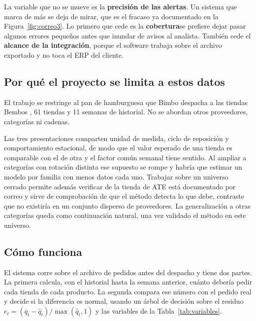 La variable que no se mueve es la \textbf{precisión de las alertas}. Un sistema que marca de más se deja de mirar, que es el fracaso ya documentado en la Figura~\ref{fig:correo3}. Lo primero que cede es la \textbf{cobertura}se prefiere dejar pasar algunos errores pequeños antes que inundar de avisos al analista. También cede el \textbf{alcance de la integración}, porque el software trabaja sobre el archivo exportado y no toca el ERP del cliente.

\subsection{Por qué el proyecto se limita a estos datos}
\label{sec:limite}

El trabajo se restringe al pan de hamburguesa que Bimbo despacha a las tiendas Bembos , 61 tiendas y 11 semanas de historial. No se abordan otros proveedores, categorías ni cadenas.

 Las tres presentaciones comparten unidad de medida, ciclo de reposición y comportamiento estacional, de modo que el valor esperado de una tienda es comparable con el de otra y el factor común semanal tiene sentido. Al ampliar a categorías con rotación distinta ese supuesto se rompe y habría que estimar un modelo por familia con menos datos cada uno. Trabajar sobre un universo cerrado permite además verificar  de la tienda de ATE está documentado por correo y sirve de comprobación de que el método detecta lo que debe, contraste que no existiría en un conjunto disperso de proveedores. La generalización a otras categorías queda como continuación natural, una vez validado el método en este universo.

\subsection{Cómo funciona}

El sistema corre sobre el archivo de pedidos antes del despacho y tiene dos partes. La primera calcula, con el historial hasta la semana anterior, cuánto debería pedir cada tienda de cada producto. La segunda compara ese número con el pedido real y decide si la diferencia es normal, usando un árbol de decisión \cite{breiman1984,quinlan1993} sobre el residuo $e_t = (q_t - \hat q_t)/\max(\hat q_t, 1)$ y las variables de la Tabla~\ref{tab:variables}.

